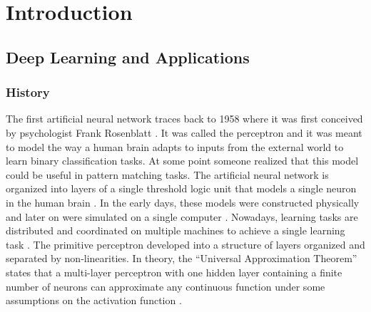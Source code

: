 
\chapter{Introduction} %

\label{Chapter1} %


\newcommand{\keyword}[1]{\textbf{#1}}
\newcommand{\tabhead}[1]{\textbf{#1}}
\newcommand{\code}[1]{\texttt{#1}}
\newcommand{\file}[1]{\texttt{\bfseries#1}}
\newcommand{\option}[1]{\texttt{\itshape#1}}


\section{Deep Learning and Applications}

\subsection{History}
The first artificial neural network traces back to 1958 where it was first conceived by psychologist Frank Rosenblatt \cite{perceptron}. It was called the perceptron and it was meant to model the way a human brain adapts to inputs from the external world to learn binary classification tasks. At some point someone realized that this model could be useful in pattern matching tasks. The artificial neural network is organized into layers of a single threshold logic unit that models a single neuron in the human brain \cite{perceptron}. In the early days, these models were constructed physically and later on were simulated on a single computer \cite{mccarthy2006proposal}. Nowadays, learning tasks are distributed and coordinated on multiple machines to achieve a single learning task \cite{dean2012large}. The primitive perceptron developed into a structure of layers organized and separated by non-linearities. In theory, the “Universal Approximation Theorem” states that a multi-layer perceptron with one hidden layer containing a finite number of neurons can approximate any continuous function under some assumptions on the activation function \cite{csaji2001approximation}. 

